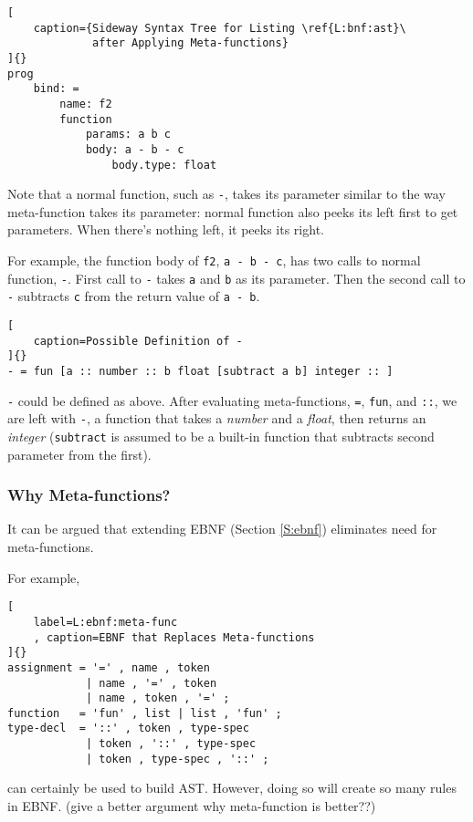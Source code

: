 \documentclass[12pt,letterpaper,notitlepage]{article}
\begin{document}
\begin{lstlisting}[
    caption={Sideway Syntax Tree for Listing \ref{L:bnf:ast}\
             after Applying Meta-functions}
]{}
prog
    bind: =
        name: f2
        function
            params: a b c
            body: a - b - c
                body.type: float
\end{lstlisting}

Note that a normal function, such as \verb!-!, takes its parameter
similar to the way meta-function takes its parameter:
normal function also peeks its left first to get parameters.
When there's nothing left, it peeks its right.

For example, the function body of \verb!f2!, \verb!a - b - c!,
has two calls to normal function, \verb!-!. First call to \verb!-!
takes \verb!a! and \verb!b! as its parameter.
Then the second call to \verb!-! subtracts \verb!c! from
the return value of \verb!a - b!.

\begin{lstlisting}[
    caption=Possible Definition of -
]{}
- = fun [a :: number :: b float [subtract a b] integer :: ]
\end{lstlisting}
\verb!-! could be defined as above.
After evaluating meta-functions, \verb!=!, \verb!fun!, and \verb!::!,
we are left with \verb!-!, a function that takes a \emph{number}
and a \emph{float},
then returns an \emph{integer} (\verb!subtract! is assumed to be
a built-in function that subtracts second parameter from the first).

\subsubsection{Why Meta-functions?}
\label{S:why-meta-func}

It can be argued that extending EBNF (Section \ref{S:ebnf})
eliminates need for meta-functions.

For example,

\begin{lstlisting}[
    label=L:ebnf:meta-func
    , caption=EBNF that Replaces Meta-functions
]{}
assignment = '=' , name , token
            | name , '=' , token
            | name , token , '=' ;
function   = 'fun' , list | list , 'fun' ;
type-decl  = '::' , token , type-spec
            | token , '::' , type-spec
            | token , type-spec , '::' ;
\end{lstlisting}

can certainly be used to build AST.
However, doing so will create so many rules in EBNF.
(give a better argument why meta-function is better??)
\end{document}
